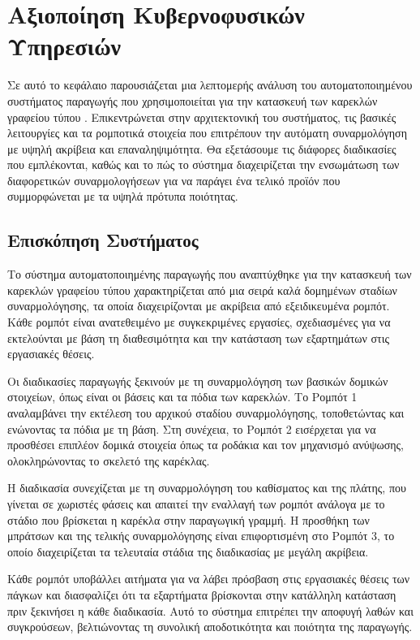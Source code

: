 \chapter{Αξιοποίηση Κυβερνοφυσικών Υπηρεσιών}\label{ch:utilization_cyberphysical_microservices}
Σε αυτό το κεφάλαιο παρουσιάζεται μια λεπτομερής ανάλυση του αυτοματοποιημένου συστήματος παραγωγής που χρησιμοποιείται για την κατασκευή των καρεκλών γραφείου τύπου . Επικεντρώνεται στην αρχιτεκτονική του συστήματος, τις βασικές λειτουργίες και τα ρομποτικά στοιχεία που επιτρέπουν την αυτόματη συναρμολόγηση με υψηλή ακρίβεια και επαναληψιμότητα. Θα εξετάσουμε τις διάφορες διαδικασίες που εμπλέκονται, καθώς και το πώς το σύστημα διαχειρίζεται την ενσωμάτωση των διαφορετικών συναρμολογήσεων για να παράγει ένα τελικό προϊόν που συμμορφώνεται με τα υψηλά πρότυπα ποιότητας.

\section{Επισκόπηση Συστήματος}
\noindent Το σύστημα αυτοματοποιημένης παραγωγής που αναπτύχθηκε για την κατασκευή των καρεκλών γραφείου τύπου  χαρακτηρίζεται από μια σειρά καλά δομημένων σταδίων συναρμολόγησης, τα οποία διαχειρίζονται με ακρίβεια από εξειδικευμένα ρομπότ. Κάθε ρομπότ είναι ανατεθειμένο με συγκεκριμένες εργασίες, σχεδιασμένες για να εκτελούνται με βάση τη διαθεσιμότητα και την κατάσταση των εξαρτημάτων στις εργασιακές θέσεις.

Οι διαδικασίες παραγωγής ξεκινούν με τη συναρμολόγηση των βασικών δομικών στοιχείων, όπως είναι οι βάσεις και τα πόδια των καρεκλών. Το Ρομπότ 1 αναλαμβάνει την εκτέλεση του αρχικού σταδίου συναρμολόγησης, τοποθετώντας και ενώνοντας τα πόδια με τη βάση. Στη συνέχεια, το Ρομπότ 2 εισέρχεται για να προσθέσει επιπλέον δομικά στοιχεία όπως τα ροδάκια και τον μηχανισμό ανύψωσης, ολοκληρώνοντας το σκελετό της καρέκλας.

Η διαδικασία συνεχίζεται με τη συναρμολόγηση του καθίσματος και της πλάτης, που γίνεται σε χωριστές φάσεις και απαιτεί την εναλλαγή των ρομπότ ανάλογα με το στάδιο που βρίσκεται η καρέκλα στην παραγωγική γραμμή. Η προσθήκη των μπράτσων και της τελικής συναρμολόγησης είναι επιφορτισμένη στο Ρομπότ 3, το οποίο διαχειρίζεται τα τελευταία στάδια της διαδικασίας με μεγάλη ακρίβεια.

Κάθε ρομπότ υποβάλλει αιτήματα για να λάβει πρόσβαση στις εργασιακές θέσεις των πάγκων και διασφαλίζει ότι τα εξαρτήματα βρίσκονται στην κατάλληλη κατάσταση πριν ξεκινήσει η κάθε διαδικασία. Αυτό το σύστημα επιτρέπει την αποφυγή λαθών και συγκρούσεων, βελτιώνοντας τη συνολική αποδοτικότητα και ποιότητα της παραγωγής.

